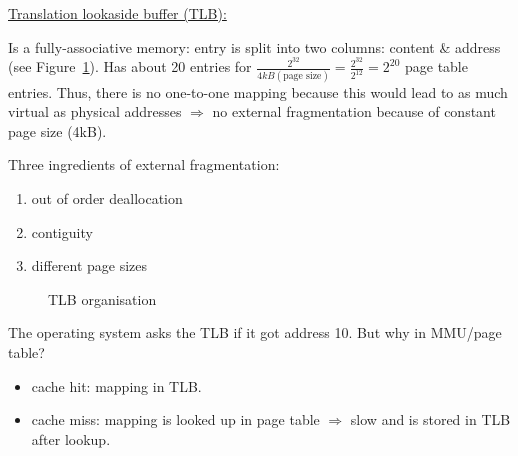 {{\begin{itemize}
		\end{itemize}
	}
	\par{
		\noindent\underline{Translation lookaside buffer (TLB):}
		\par{
			\noindent
			Is a fully-associative memory: entry is split into two columns: content \& address (see Figure~\ref{fig:tlborg}). Has about 20 entries for $\frac{2^{32}}{4kB (\text{page size})} = \frac{2^{32}}{2^{12}} = 2^{20}$ page table entries. Thus, there is no one-to-one mapping because this would lead to as much virtual as physical addresses $\Rightarrow$ no external fragmentation because of constant page size (4kB).
		}
		\par{
			\noindent Three ingredients of external fragmentation:
			\parskip0pt\begin{enumerate}
				\item{out of order deallocation}
				\item{contiguity}
				\item{different page sizes}
			\end{enumerate}
		}
		\begin{figure}[H]
			\centering
			\caption{TLB organisation}
			\label{fig:tlborg}
		\end{figure}
		\par{
			\noindent
			The operating system asks the TLB if it got address 10. But why in MMU/page table?
			\parskip0pt\begin{itemize}
				\item{cache hit: mapping in TLB.}
				\item{cache miss: mapping is looked up in page table $\Rightarrow$ slow and is stored in TLB after lookup.}

\end{itemize}}}}
